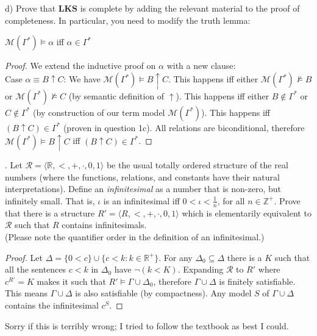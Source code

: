 \documentclass[11pt]{article}
\begin{document}
\noindent
d) Prove that $\mathbf{LKS}$ is complete by adding the relevant material to the proof of completeness. In particular, you need to modify the truth lemma: 
\begin{center}
    $\mathcal{M}(\Gamma^*) \models \alpha$ iff $\alpha \in \Gamma^*$
\end{center}

\color{RoyalBlue}
\begin{proof}
We extend the inductive proof on $\alpha$ with a new clause: \\

\noindent
Case $\alpha \equiv B \uparrow C$: We have $\mathcal{M}(\Gamma^*) \models B \uparrow C$. This happens iff either $\mathcal{M}(\Gamma^*) \not\models B$ or $\mathcal{M}(\Gamma^*) \not\models C$ (by semantic definition of $\uparrow$). This happens iff either $B \not\in \Gamma^*$ or $C \not\in \Gamma^*$ (by construction of our term model $\mathcal{M}(\Gamma^*)$). This happens iff $(B \uparrow C) \in \Gamma^*$ (proven in question 1c). All relations are biconditional, therefore $\mathcal{M}(\Gamma^*) \models B \uparrow C$ iff $(B \uparrow C) \in \Gamma^*$.
\end{proof}
\color{black}



\newpage



. Let $\mathcal{R} = \langle \mathbb{R}, <, +, \cdot, 0, 1 \rangle$ be the usual totally ordered structure of the real numbers (where the functions, relations, and constants have their natural interpretations). Define an \textit{infinitesimal} as a number that is non-zero, but infinitely small. That is, $\iota$ is an infinitesimal iff $0<\iota<\frac{1}{n}$, for all $n \in \mathbb{Z}^+$. Prove that there is a structure $R' = \langle R, <, +, \cdot, 0, 1 \rangle$ which is elementarily equivalent to $\mathcal{R}$ such that $R$ contains infinitesimals. \\
(Please note the quantifier order in the definition of an infinitesimal.)

\color{RoyalBlue}
\begin{proof}
Let $\Delta = \{0 < c\} \cup \{c < k: k \in \mathbb{R}^+\}$. For any $\Delta_0 \subseteq \Delta$ there is a $K$ such that all the sentences $c<k$ in $\Delta_0$ have $\neg(k<K)$. Expanding $\mathcal{R}$ to $R'$ where $c^{R'}=K$ makes it such that $R' \models \Gamma \cup \Delta_0$, therefore $\Gamma \cup \Delta$ is finitely satisfiable. This means $\Gamma \cup \Delta$ is also satisfiable (by compactness). Any model $S$ of $\Gamma \cup \Delta$ contains the infinitesimal $c^S$.
\end{proof}
\noindent
Sorry if this is terribly wrong; I tried to follow the textbook as best I could. \\
\color{black}
\end{document}
